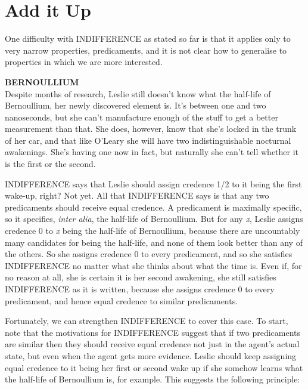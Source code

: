 \documentclass[
  11pt,
  letterpaper,
  DIV=11,
  numbers=noendperiod,
  oneside]{scrartcl}
\begin{document}
\section{Add it Up}\label{add-it-up}

One difficulty with INDIFFERENCE as stated so far is that it applies
only to very narrow properties, predicaments, and it is not clear how to
generalise to properties in which we are more interested.

\textbf{BERNOULLIUM}\\
Despite months of research, Leslie still doesn't know what the half-life
of Bernoullium, her newly discovered element is. It's between one and
two nanoseconds, but she can't manufacture enough of the stuff to get a
better measurement than that. She does, however, know that she's locked
in the trunk of her car, and that like O'Leary she will have two
indistinguishable nocturnal awakenings. She's having one now in fact,
but naturally she can't tell whether it is the first or the second.

INDIFFERENCE says that Leslie should assign credence 1/2 to it being the
first wake-up, right? Not yet. All that INDIFFERENCE says is that any
two predicaments should receive equal credence. A predicament is
maximally specific, so it specifies, \emph{inter alia}, the half-life of
Bernoullium. But for any \emph{x}, Leslie assigns credence 0 to \emph{x}
being the half-life of Bernoullium, because there are uncountably many
candidates for being the half-life, and none of them look better than
any of the others. So she assigns credence 0 to every predicament, and
so she satisfies INDIFFERENCE no matter what she thinks about what the
time is. Even if, for no reason at all, she is certain it is her second
awakening, she still satisfies INDIFFERENCE as it is written, because
she assigns credence 0 to every predicament, and hence equal credence to
similar predicaments.

Fortunately, we can strengthen INDIFFERENCE to cover this case. To
start, note that the motivations for INDIFFERENCE suggest that if two
predicaments are similar then they should receive equal credence not
just in the agent's actual state, but even when the agent gets more
evidence. Leslie should keep assigning equal credence to it being her
first or second wake up if she somehow learns what the half-life of
Bernoullium is, for example. This suggests the following
principle:
\end{document}
